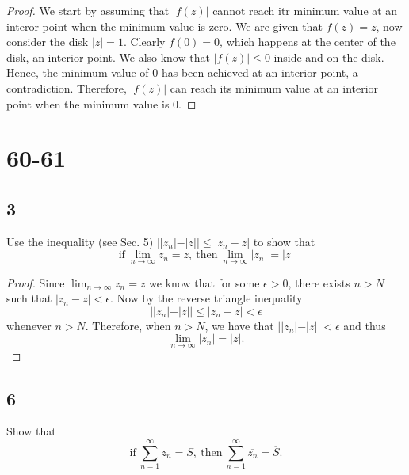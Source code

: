 \documentclass{article}
\begin{document}
\begin{proof}
    We start by assuming that $|f(z)|$ cannot reach itr minimum value at an interor
    point when the minimum value is zero. We are given that $f(z) = z$, now consider
    the disk $|z| = 1$. Clearly $f(0) = 0$, which happens at the center of the disk,
    an interior point. We also know that $|f(z)| \leq 0$ inside and on the disk.
    Hence, the minimum value of $0$ has been achieved at an interior point,
    a contradiction. Therefore, $|f(z)|$ can reach its minimum value at an interior
    point when the minimum value is $0$.
\end{proof}

\section*{60-61}
\subsection*{3}
Use the inequality (see Sec. 5) $||z_n| - |z|| \leq |z_n - z|$ to show that
\begin{equation*}
    \text{if} \ \lim_{n\rightarrow\infty}z_n = z, \ \text{then} \
    \lim_{n\rightarrow\infty} |z_n| = |z|
\end{equation*}

\begin{proof}
    Since $\lim_{n\rightarrow\infty}z_n = z$ we know that for some $\epsilon > 0$,
    there exists $n > N$ such that $|z_n - z| < \epsilon$. Now by the reverse
    triangle inequality
    \begin{equation*}
        ||z_n| - |z|| \leq |z_n - z| < \epsilon
    \end{equation*}
    whenever $n > N$. Therefore, when $n > N$, we have that
    $||z_n| - |z|| < \epsilon$ and thus
    \begin{equation*}
        \lim_{n\rightarrow\infty} |z_n| = |z|.
    \end{equation*}
\end{proof}

\subsection*{6}
Show that
\begin{equation*}
    \text{if} \ \sum_{n=1}^\infty z_n = S, \ \text{then} \
    \sum_{n=1}^\infty \overline{z_n} = \overline{S}.
\end{equation*}
\end{document}

